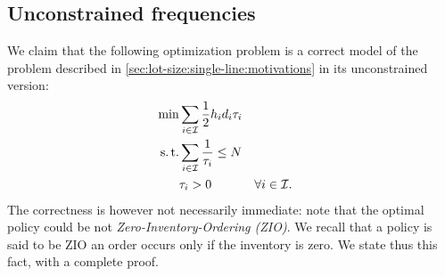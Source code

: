 





\subsection{Unconstrained frequencies}



We claim that the following optimization problem is a correct model of the problem described in \cref{sec:lot-size:single-line:motivations} in its unconstrained version:
\begin{subequations}\label{eq:lot-size:single-line:deterministic:unconstraint}
  \begin{align}
  \min & \displaystyle\sum_{i\in\mathcal{I}} \frac{1}{2}h_id_i\tau_i
  \label{eq:lot-size:single-line:deterministic:unconstraint:objective}
  \\
  \operatorname{s.t.}  & \displaystyle\sum_{i\in\mathcal{I}} \frac{1}{\tau_i} \le N
  \label{eq:lot-size:single-line:deterministic:unconstraint:flexibility}
  \\
       & \tau_i > 0 && \forall i\in\mathcal{I}.
  \label{eq:lot-size:single-line:deterministic:unconstraint:positivity}
  \end{align}
\end{subequations}
The correctness is however not necessarily immediate: note that the optimal policy could be not \emph{Zero-Inventory-Ordering (ZIO)}.
We recall that a policy is said to be ZIO an order occurs only if the inventory is zero.
We state thus this fact, with a complete proof.


